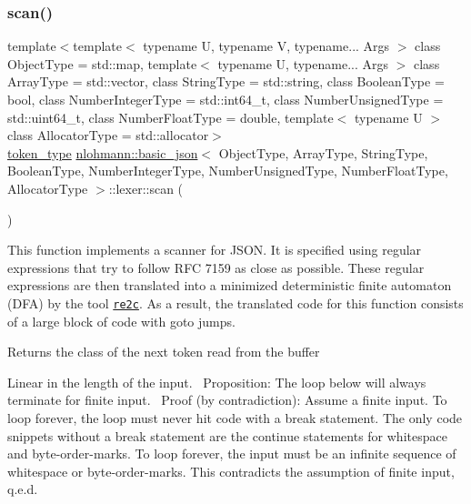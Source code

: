 \subsubsection{\texorpdfstring{scan()}{scan()}}
{\footnotesize\ttfamily template$<$template$<$ typename U, typename V, typename... Args $>$ class Object\+Type = std\+::map, template$<$ typename U, typename... Args $>$ class Array\+Type = std\+::vector, class String\+Type  = std\+::string, class Boolean\+Type  = bool, class Number\+Integer\+Type  = std\+::int64\+\_\+t, class Number\+Unsigned\+Type  = std\+::uint64\+\_\+t, class Number\+Float\+Type  = double, template$<$ typename U $>$ class Allocator\+Type = std\+::allocator$>$ \\
\hyperlink{classnlohmann_1_1basic__json_1_1lexer_a96887d6cd131e3d3a85a9d71fbdbcdf7}{token\+\_\+type} \hyperlink{classnlohmann_1_1basic__json}{nlohmann\+::basic\+\_\+json}$<$ Object\+Type, Array\+Type, String\+Type, Boolean\+Type, Number\+Integer\+Type, Number\+Unsigned\+Type, Number\+Float\+Type, Allocator\+Type $>$\+::lexer\+::scan (\begin{DoxyParamCaption}{ }\end{DoxyParamCaption})\hspace{0.3cm}{\ttfamily [inline]}}

This function implements a scanner for J\+S\+ON. It is specified using regular expressions that try to follow R\+FC 7159 as close as possible. These regular expressions are then translated into a minimized deterministic finite automaton (D\+FA) by the tool \href{http://re2c.org}{\tt re2c}. As a result, the translated code for this function consists of a large block of code with {\ttfamily goto} jumps.

\begin{DoxyReturn}{Returns}
the class of the next token read from the buffer
\end{DoxyReturn}
Linear in the length of the input.~\newline
 Proposition\+: The loop below will always terminate for finite input.~\newline
 Proof (by contradiction)\+: Assume a finite input. To loop forever, the loop must never hit code with a {\ttfamily break} statement. The only code snippets without a {\ttfamily break} statement are the continue statements for whitespace and byte-\/order-\/marks. To loop forever, the input must be an infinite sequence of whitespace or byte-\/order-\/marks. This contradicts the assumption of finite input, q.\+e.\+d. \hypertarget{classnlohmann_1_1basic__json_1_1lexer_a94c388ac544f25ed68cdb9426bd22977}{}\label{classnlohmann_1_1basic__json_1_1lexer_a94c388ac544f25ed68cdb9426bd22977} 
